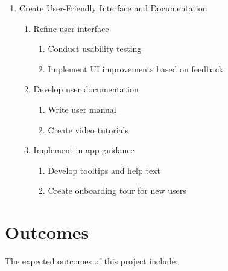 \documentclass[12pt]{article}
\begin{document}
\begin{enumerate}
    \item Create User-Friendly Interface and Documentation
    \begin{enumerate}
        \item Refine user interface
        \begin{enumerate}
            \item Conduct usability testing
            \item Implement UI improvements based on feedback
        \end{enumerate}
        \item Develop user documentation
        \begin{enumerate}
            \item Write user manual
            \item Create video tutorials
        \end{enumerate}
        \item Implement in-app guidance
        \begin{enumerate}
            \item Develop tooltips and help text
            \item Create onboarding tour for new users
        \end{enumerate}
    \end{enumerate}
\end{enumerate}


\section{Outcomes}
The expected outcomes of this project include:
\end{document}
